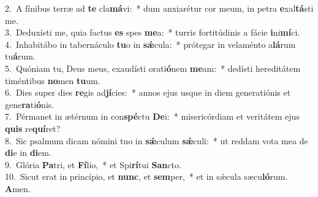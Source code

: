 {2.~}A fínibus terræ ad \textbf{te} cla\textbf{má}vi:~* dum anxiarétur cor meum, in petra \textbf{e}xal\textbf{tá}sti me.\\
{3.~}Deduxísti me, quia factus \textbf{es} spes \textbf{me}a:~* turris fortitúdinis a fácie \textbf{i}ni\textbf{mí}ci.\\
{4.~}Inhabitábo in tabernáculo \textbf{tu}o in \textbf{sǽ}cula:~* prótegar in velaménto a\textbf{lá}rum tu\textbf{á}rum.\\
{5.~}Quóniam tu, Deus meus, exaudísti orati\textbf{ó}nem \textbf{me}am:~* dedísti hereditátem timéntibus \textbf{no}men \textbf{tu}um.\\
{6.~}Dies super dies \textbf{re}gis ad\textbf{jí}cies:~* annos ejus usque in diem generatiónis et gene\textbf{ra}ti\textbf{ó}nis.\\
{7.~}Pérmanet in ætérnum in con\textbf{spé}ctu \textbf{De}i:~* misericórdiam et veritátem ejus \textbf{quis} re\textbf{quí}ret?\\
{8.~}Sic psalmum dicam nómini tuo in \textbf{sǽ}culum \textbf{sǽ}culi:~* ut reddam vota mea de \textbf{di}e in \textbf{di}em.\\
{9.~}Glória \textbf{Pa}tri, et \textbf{Fí}lio,~* et Spi\textbf{rí}tui \textbf{San}cto.\\
{10.~}Sicut erat in princípio, et \textbf{nunc}, et \textbf{sem}per,~* et in sǽcula sæcu\textbf{ló}rum. \textbf{A}men.\\
